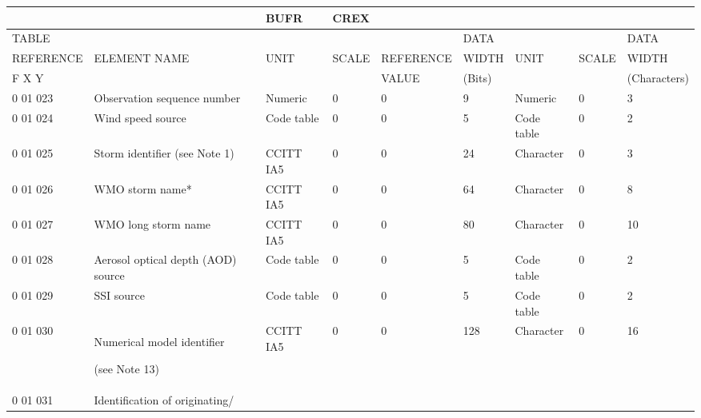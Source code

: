 \begin{longtable}[]{@{}lllllllll@{}}
\toprule
& & BUFR & CREX & & & & &\tabularnewline
\midrule
\endhead
TABLE & & & & & DATA & & & DATA\tabularnewline
REFERENCE & ELEMENT NAME & UNIT & SCALE & REFERENCE & WIDTH & UNIT & SCALE & WIDTH\tabularnewline
F X Y & & & & VALUE & (Bits) & & & (Characters)\tabularnewline
0 01 023 & Observation sequence number & Numeric & 0 & 0 & 9 & Numeric & 0 & 3\tabularnewline
0 01 024 & Wind speed source & Code table & 0 & 0 & 5 & Code table & 0 & 2\tabularnewline
0 01 025 & Storm identifier (see Note 1) & CCITT IA5 & 0 & 0 & 24 & Character & 0 & 3\tabularnewline
0 01 026 & WMO storm name* & CCITT IA5 & 0 & 0 & 64 & Character & 0 & 8\tabularnewline
0 01 027 & WMO long storm name & CCITT IA5 & 0 & 0 & 80 & Character & 0 & 10\tabularnewline
0 01 028 & Aerosol optical depth (AOD) source & Code table & 0 & 0 & 5 & Code table & 0 & 2\tabularnewline
0 01 029 & SSI source & Code table & 0 & 0 & 5 & Code table & 0 & 2\tabularnewline
\begin{minipage}[t]{0.08\columnwidth}\raggedright
0 01 030\strut
\end{minipage} & \begin{minipage}[t]{0.08\columnwidth}\raggedright
Numerical model identifier

(see Note 13)\strut
\end{minipage} & \begin{minipage}[t]{0.08\columnwidth}\raggedright
CCITT IA5\strut
\end{minipage} & \begin{minipage}[t]{0.08\columnwidth}\raggedright
0\strut
\end{minipage} & \begin{minipage}[t]{0.08\columnwidth}\raggedright
0\strut
\end{minipage} & \begin{minipage}[t]{0.08\columnwidth}\raggedright
128\strut
\end{minipage} & \begin{minipage}[t]{0.08\columnwidth}\raggedright
Character\strut
\end{minipage} & \begin{minipage}[t]{0.08\columnwidth}\raggedright
0\strut
\end{minipage} & \begin{minipage}[t]{0.08\columnwidth}\raggedright
16\strut
\end{minipage}\tabularnewline
\begin{minipage}[t]{0.08\columnwidth}\raggedright
0 01 031\strut
\end{minipage} & \begin{minipage}[t]{0.08\columnwidth}\raggedright
Identification of originating/


\end{minipage}
\end{longtable}
